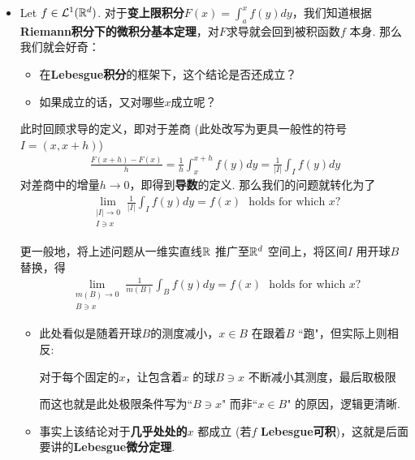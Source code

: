 	\begin{itemize}
		\item Let $f \in \mathcal{L}^{1}(\mathbb{R}^d)$. 对于\textbf{变上限积分}$F(x) = \int_{a}^{x}{f(y) dy}$，我们知道根据\textbf{Riemann积分下的微积分基本定理}，对$F$求导就会回到被积函数$f$ 本身. 那么我们就会好奇：
		
		\vspace{1em}
		
		\begin{itemize}
			\item 在\textbf{Lebesgue积分}的框架下，这个结论是否还成立？
			
			\item 如果成立的话，又对哪些$x$成立呢？
		\end{itemize}
	
		\vspace{1em}
		
		此时回顾求导的定义，即对于差商 (此处改写为更具一般性的符号$I = (x , x + h)$)
		\begin{align}
			\frac{F(x + h) - F(x)}{h} 
			= \frac{1}{h} \int_{x}^{x + h}{f(y) dy} 
			= \frac{1}{\left| I \right|} \int_{I}{f(y) dy}
		\end{align}
		对差商中的增量$h \to 0$，即得到\textbf{导数}的定义. 那么我们的问题就转化为了
		\begin{align}
			\lim_{\substack{\left| I \right| \to 0 \\ I \ni x}}{\frac{1}{\left| I \right|} \int_{I}{f(y) dy}}
			= f(x) 
			\,\,\,\, \text{holds for which $x$?}
		\end{align}
	
		\vspace{1em}
		
		更一般地，将上述问题从一维实直线$\mathbb{R}$ 推广至$\mathbb{R}^d$ 空间上，将区间$I$ 用开球$B$ 替换，得
		\begin{align}
			\lim_{\substack{m(B) \to 0 \\ B \ni x}}{\frac{1}{m(B)} \int_{B}{f(y) dy}}
			= f(x)
			\,\,\,\, \text{holds for which $x$?}
		\end{align}
	
		\vspace{1em}
		
		\begin{rmk}
			\begin{itemize}
				\item 此处看似是随着开球$B$的测度减小，$x \in B$ 在跟着$B$ ``跑"，但实际上则相反:
				\begin{center}
					对于每个固定的$x$，让包含着$x$ 的球$B \ni x$ 不断减小其测度，最后取极限 
				\end{center}	
				而这也就是此处极限条件写为``$B \ni x$" 而非``$x \in B$" 的原因，逻辑更清晰.
				
				\vspace{1em}
				
				\item 事实上该结论对于\textbf{几乎处处的$x$} 都成立 (若$f$ \textbf{Lebesgue可积})，这就是后面要讲的\textbf{Lebesgue微分定理}.
			\end{itemize}
		\end{rmk}
	\end{itemize}
	
